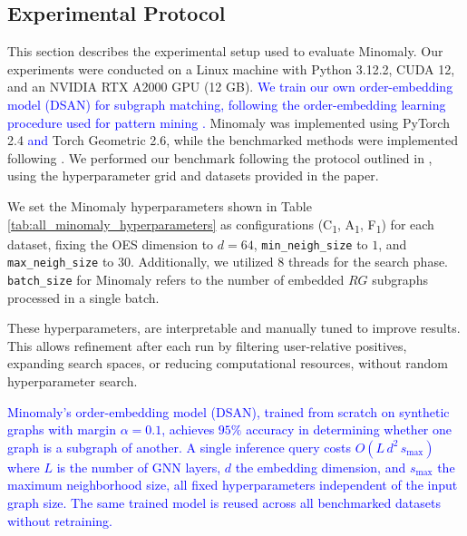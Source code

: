 \documentclass[preprint,12pt]{elsarticle}
\newcommand{\new}[1]{\textcolor{blue}{#1}}
\theoremstyle{plain}
\theoremstyle{definition}
\theoremstyle{remark}
\begin{document}
\subsection{Experimental Protocol}
This section describes the experimental setup used to evaluate Minomaly. Our experiments were conducted on a Linux machine with Python 3.12.2, CUDA 12, and an NVIDIA RTX A2000 GPU (12 GB). \new{We train our own order-embedding model (DSAN) for subgraph matching, following the order-embedding learning procedure used for pattern mining \cite{ying2024representation,vendrov2016orderembeddings}.} Minomaly was implemented using PyTorch 2.4 \new{and} Torch Geometric 2.6, while the benchmarked methods were implemented following \cite{JMLR:v25:23-0963}. We performed our benchmark following the protocol outlined in \cite{NEURIPS2022-acc1ec4a}, using the hyperparameter grid and datasets provided in the paper.

We set the Minomaly hyperparameters shown in Table \ref{tab:all_minomaly_hyperparameters} as configurations (C\textsubscript{1}, A\textsubscript{1}, F\textsubscript{1}) for each dataset, fixing the OES dimension to $d = 64$, \texttt{min\_neigh\_size} to $1$, and \texttt{max\_neigh\_size} to $30$. Additionally, we utilized $8$ threads for the search phase. \texttt{batch\_size} for Minomaly refers to the number of embedded $RG$ subgraphs processed in a single batch.

These hyperparameters, are interpretable and manually tuned to improve results. This allows refinement after each run by filtering user-relative positives, expanding search spaces, or reducing computational resources, without random hyperparameter search.

\new{Minomaly's order-embedding model (DSAN), trained from scratch on synthetic graphs with margin $\alpha = 0.1$, achieves \(95\%\) accuracy in determining whether one graph is a subgraph of another. A single inference query costs $O(L\,d^2\,s_{\max})$ where $L$ is the number of GNN layers, $d$ the embedding dimension, and $s_{\max}$ the maximum neighborhood size, all fixed hyperparameters independent of the input graph size. The same trained model is reused across all benchmarked datasets without retraining.}
\end{document}

